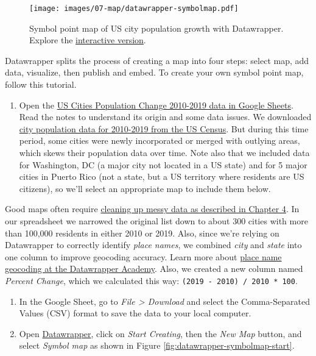 \documentclass[
  english,
]{book}
\providecommand{\tightlist}{%
  \setlength{\itemsep}{0pt}\setlength{\parskip}{0pt}}
\begin{document}
\begin{figure}
\centering
\texttt{[image: images/07-map/datawrapper-symbolmap.pdf]}
\caption{\label{fig:datawrapper-symbolmap}Symbol point map of US city population growth with Datawrapper. Explore the \href{https://datawrapper.dwcdn.net/V0V9Y}{interactive version}.}
\end{figure}

Datawrapper splits the process of creating a map into four steps: select map, add data, visualize, then publish and embed. To create your own symbol point map, follow this tutorial.

\begin{enumerate}
\def\labelenumi{\arabic{enumi}.}
\tightlist
\item
  Open the \href{https://docs.google.com/spreadsheets/d/1XOhNtvYWaebP4izr0PDJfToRIbl2vki_1JNMYTKCCn0/edit\#gid=1709919231}{US Cities Population Change 2010-2019 data in Google Sheets}. Read the notes to understand its origin and some data issues. We downloaded \href{https://www.census.gov/data/tables/time-series/demo/popest/2010s-total-cities-and-towns.html}{city population data for 2010-2019 from the US Census}. But during this time period, some cities were newly incorporated or merged with outlying areas, which skews their population data over time. Note also that we included data for Washington, DC (a major city not located in a US state) and for 5 major cities in Puerto Rico (not a state, but a US territory where residents are US citizens), so we'll select an appropriate map to include them below.
\end{enumerate}

Good maps often require \href{clean.html}{cleaning up messy data as described in Chapter 4}. In our spreadsheet we narrowed the original list down to about 300 cities with more than 100,000 residents in either 2010 or 2019. Also, since we're relying on Datawrapper to correctly identify \emph{place names}, we combined \emph{city} and \emph{state} into one column to improve geocoding accuracy. Learn more about \href{https://academy.datawrapper.de/article/193-symbol-location-accuracy-using-addresses-place-names}{place name geocoding at the Datawrapper Academy}. Also, we created a new column named \emph{Percent Change}, which we calculated this way: \texttt{(2019\ -\ 2010)\ /\ 2010\ *\ 100}.

\begin{enumerate}
\def\labelenumi{\arabic{enumi}.}
\setcounter{enumi}{1}
\item
  In the Google Sheet, go to \emph{File \textgreater{} Download} and select the Comma-Separated Values (CSV) format to save the data to your local computer.
\item
  Open \href{https://www.datawrapper.de}{Datawrapper}, click on \emph{Start Creating}, then the \emph{New Map} button, and select \emph{Symbol map} as shown in Figure \ref{fig:datawrapper-symbolmap-start}.
\end{enumerate}
\end{document}
